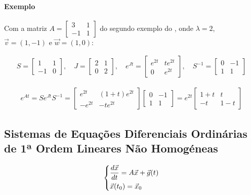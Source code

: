 \documentclass{article}
\begin{document}
\paragraph{Exemplo}

Com a matriz $A = \begin{bmatrix} 3 & 1 \\ -1 & 1 \end{bmatrix}$ do segundo exemplo do
, onde $\lambda = 2$, $\vec{v} = (1, -1)$ e $\vec{w} = (1, 0)$:

\begin{gather*}
S =
\begin{bmatrix}
1 & 1 \\
-1 & 0
\end{bmatrix},
\quad
J =
\begin{bmatrix}
2 & 1 \\
0 & 2
\end{bmatrix},
\quad
e^{Jt} =
\begin{bmatrix}
e^{2t} & t e^{2t} \\
0 & e^{2t}
\end{bmatrix},
\quad
S^{-1} =
\begin{bmatrix}
0 & -1 \\
1 & 1
\end{bmatrix}
\end{gather*}

\begin{gather*}
\boxed{e^{At} = S e^{Jt} S^{-1} =
\begin{bmatrix}
e^{2t} & (1 + t)e^{2t} \\
-e^{2t} & -t e^{2t}
\end{bmatrix}
\begin{bmatrix}
0 & -1 \\
1 & 1
\end{bmatrix}
=
e^{2t}
\begin{bmatrix}
1 + t & t \\
-t & 1 - t
\end{bmatrix}}
\end{gather*}

\bigskip

\subsection{Sistemas de Equações Diferenciais Ordinárias de 1ª Ordem Lineares Não Homogéneas}
\label{subsec: sistemas-edo-ordem1-lineares-nao-homogeneos}

\begin{gather*}
\begin{dcases}
\frac{d\vec{x}}{dt} = A\vec{x} + \vec{g}(t) \\
\vec{x}(t_0) = \vec{x}_0
\end{dcases}
\end{gather*}
\end{document}
